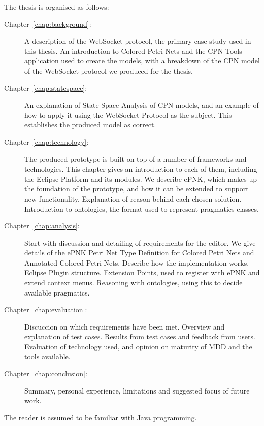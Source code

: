 The thesis is organised as follows:
\begin{description}
\item[Chapter~\ref{chap:background}:~] A description
of the WebSocket protocol, the primary case study used in this thesis. An
introduction to Colored Petri Nets and the CPN Tools application used to
create the models, with a breakdown of the CPN model of the WebSocket protocol
we produced for the thesis.
\item[Chapter~\ref{chap:statespace}:~] An explanation
of State Space Analysis of CPN models, and an example of how to apply it using
the WebSocket Protocol as the subject. This establishes the produced model as
correct.
\item [Chapter~\ref{chap:technology}:~] The produced
prototype is built on top of a number of frameworks and technologies. This
chapter gives an introduction to each of them, including the Eclipse Platform
and its modules. We describe ePNK, which makes up the foundation of the
prototype, and how it can be extended to support new functionality. Explanation
of reason behind each chosen solution. Introduction to ontologies, the format
used to represent pragmatics classes.
\item [Chapter~\ref{chap:analysis}:~] Start with
discussion and detailing of requirements for the editor. 
We give details of the ePNK Petri Net Type Definition for Colored Petri Nets and
Annotated Colored Petri Nets. Describe how the implementation works.
Eclipse Plugin structure. Extension Points, used to register with ePNK
and extend context menus. Reasoning with ontologies, using this to decide
available pragmatics.
\item [Chapter~\ref{chap:evaluation}:~] Discuccion on
which requirements have been met. Overview and explanation of test cases.
Results from test cases and feedback from users. Evaluation of technology used,
and opinion on maturity of MDD and the tools available.
\item [Chapter~\ref{chap:conclusion}:~] Summary,
personal experience, limitations and suggested focus of future work.
\end{description} 


The reader is assumed to be familiar with Java programming. 